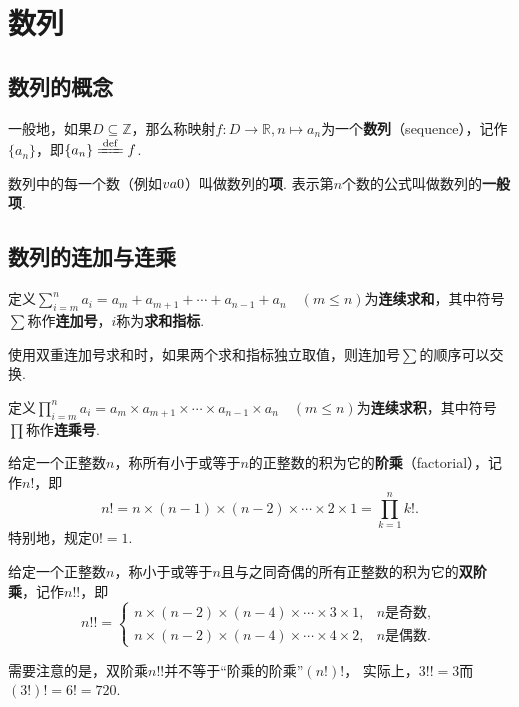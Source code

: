 \chapter{数列}
\section{数列的概念}
\begin{definition}\label{definition.数列.数列的定义}
一般地，如果\(D \subseteq \mathbb{Z}\)，那么称映射\(f\colon D\to\mathbb{R}, n \mapsto a_n\)为一个\textbf{数列}（sequence），记作\(\{a_n\}\)，即\(\{a_n\} \defeq f\).

数列中的每一个数（例如\(v{a}{0}\)）叫做数列的\textbf{项}.
表示第\(n\)个数的公式叫做数列的\textbf{一般项}.
\end{definition}

\section{数列的连加与连乘}
\begin{definition}[连加]
定义\(\sum\limits_{i=m}^{n} {a_i} = a_m+a_{m+1}+\dotsb+a_{n-1}+a_n \quad (m \leqslant n)\)为\textbf{连续求和}，其中符号\(\sum\)称作\textbf{连加号}，\(i\)称为\textbf{求和指标}.
\end{definition}
使用双重连加号求和时，如果两个求和指标独立取值，则连加号\(\sum\)的顺序可以交换.

\begin{definition}[连乘]
定义\(\prod\limits_{i=m}^{n} {a_i} = a_m \times a_{m+1} \times \dotsb \times a_{n-1} \times a_n \quad (m \leqslant n)\)为\textbf{连续求积}，其中符号\(\prod\)称作\textbf{连乘号}.
\end{definition}

\begin{definition}
给定一个正整数\(n\)，称所有小于或等于\(n\)的正整数的积为它的\textbf{阶乘}（factorial），记作\(n!\)，即\begin{equation}
n! = n \times (n-1) \times (n-2) \times \dotsm \times 2 \times 1
= \prod\limits_{k=1}^n k!.
\end{equation}
特别地，规定\(0! = 1\).
\end{definition}

\begin{definition}
给定一个正整数\(n\)，称小于或等于\(n\)且与之同奇偶的所有正整数的积为它的\textbf{双阶乘}，记作\(n!!\)，即\begin{equation}
n!! = \begin{cases}
n \times (n-2) \times (n-4) \times \dotsm \times 3 \times 1, & n\text{是奇数}, \\
n \times (n-2) \times (n-4) \times \dotsm \times 4 \times 2, & n\text{是偶数}.
\end{cases}
\end{equation}
\end{definition}
需要注意的是，双阶乘\(n!!\)并不等于“阶乘的阶乘”\((n!)!\)，%
实际上，\(3!! = 3\)而\((3!)! = 6! = 720\).

